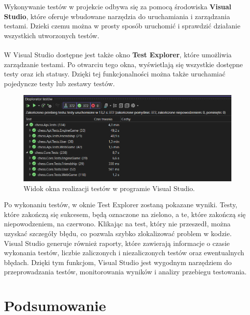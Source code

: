 \documentclass[twoside]{projektInzynierskiMS1}
\begin{document}
\noindent
Wykonywanie testów w projekcie odbywa się za pomocą środowiska \textbf{Visual Studio}, które oferuje wbudowane narzędzia do uruchamiania i zarządzania testami. Dzieki czemu można w prosty sposób uruchomić i sprawdzić działanie wszystkich utworzonych testów.
\\\\
W Visual Studio dostępne jest także okno \textbf{Test Explorer}, które umożliwia zarządzanie testami. Po otwarciu tego okna, wyświetlają się wszystkie dostępne testy oraz ich statusy. Dzięki tej funkcjonalności można także uruchamiać pojedyncze testy lub zestawy testów.

\vspace{0.5cm}
\begin{figure}[h!]
    \centering
    \includegraphics[width=1\textwidth]{images/vs_tests.png}
    \caption{Widok okna realizacji testów w programie Visual Studio.}
\end{figure}
\vspace{0.5cm}

\noindent
Po wykonaniu testów, w oknie Test Explorer zostaną pokazane wyniki. Testy, które zakończą się sukcesem, będą oznaczone na zielono, a te, które zakończą się niepowodzeniem, na czerwono. Klikając na test, który nie przeszedł, można uzyskać szczegóły błędu, co pozwala szybko zlokalizować problem w kodzie. Visual Studio generuje również raporty, które zawierają informacje o czasie wykonania testów, liczbie zaliczonych i niezaliczonych testów oraz ewentualnych błędach. Dzięki tym funkcjom, Visual Studio jest wygodnym narzędziem do przeprowadzania testów, monitorowania wyników i analizy przebiegu testowania.

\newpage

\section{Podsumowanie}
\end{document}
